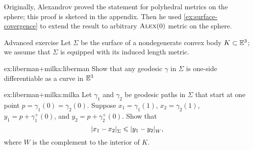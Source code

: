 Originally, Alexandrov proved the statement for polyhedral metrics on the sphere; this proof is sketced in the appendix.
Then he used \ref{ex:surface-covergence} to extend the result to arbitrary $\textsc{Alex}(0)$ metric on the sphere.

\begin{thm}{Advanced exercise}\label{ex:liberman+milka}
Let $\Sigma$ be the surface of a nondegenerate convex body $K\subset\mathbb{E}^3$;
we assume that $\Sigma$ is equipped with its induced length metric.

\begin{subthm}{ex:liberman+milka:liberman}
Show that any geodesic $\gamma$ in $\Sigma$ is one-side differentiable as a curve in $\mathbb{E}^3$ 
\end{subthm}

\begin{subthm}{ex:liberman+milka:milka}
Let $\gamma_1$ and $\gamma_2$ be geodesic paths in $\Sigma$ that start at one point $p=\gamma_1(0)=\gamma_2(0)$.
Suppose $x_1=\gamma_1(1)$, $x_2=\gamma_2(1)$, $y_1=p+\gamma_1^+(0)$, and $y_2=p+\gamma_2^+(0)$.
Show that 
\[\dist{x_1}{x_2}{\Sigma}\le \dist{y_1}{y_2}{W},\]
where $W$ is the complement to the interior of $K$.
\end{subthm}

\end{thm}

